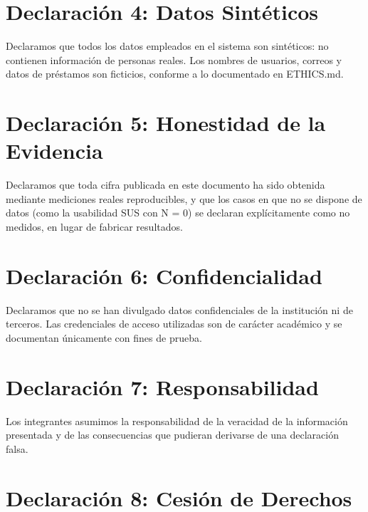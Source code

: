 \documentclass[
11pt,
a4paper,
]{report}
\begin{document}
	\hypertarget{declaracion-4-datos-sinteticos}{%
		\section{Declaración 4: Datos Sintéticos}\label{declaracion-4-datos-sinteticos}}
	
	Declaramos que todos los datos empleados en el sistema son sintéticos: no contienen información de personas reales. Los nombres de usuarios, correos y datos de préstamos son ficticios, conforme a lo documentado en ETHICS.md.
	
	\hypertarget{declaracion-5-honestidad-de-la-evidencia}{%
		\section{Declaración 5: Honestidad de la Evidencia}\label{declaracion-5-honestidad-de-la-evidencia}}
	
	Declaramos que toda cifra publicada en este documento ha sido obtenida mediante mediciones reales reproducibles, y que los casos en que no se dispone de datos (como la usabilidad SUS con N = 0) se declaran explícitamente como no medidos, en lugar de fabricar resultados.
	
	\hypertarget{declaracion-6-confidencialidad}{%
		\section{Declaración 6: Confidencialidad}\label{declaracion-6-confidencialidad}}
	
	Declaramos que no se han divulgado datos confidenciales de la institución ni de terceros. Las credenciales de acceso utilizadas son de carácter académico y se documentan únicamente con fines de prueba.
	
	\hypertarget{declaracion-7-responsabilidad}{%
		\section{Declaración 7: Responsabilidad}\label{declaracion-7-responsabilidad}}
	
	Los integrantes asumimos la responsabilidad de la veracidad de la información presentada y de las consecuencias que pudieran derivarse de una declaración falsa.
	
	\hypertarget{declaracion-8-cedula-de-derechos}{%
		\section{Declaración 8: Cesión de Derechos}\label{declaracion-8-cedula-de-derechos}}
	
\end{document}

